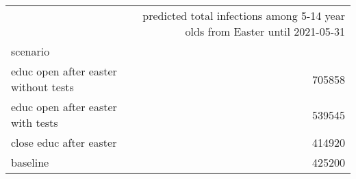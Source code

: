 \begin{tabular}{lr}
\toprule
{} &  predicted total infections among 5-14 year olds from Easter until 2021-05-31 \\
scenario                               &                                                                               \\
\midrule
 educ open after easter  without tests &                                             705858 \\
 educ open after easter  with tests    &                                             539545 \\
 close educ after easter               &                                             414920 \\
 baseline                              &                                             425200 \\
\bottomrule
\end{tabular}
